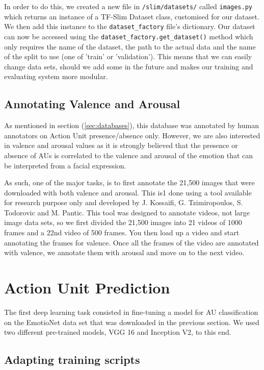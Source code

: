 \documentclass[12pt,twoside]{article}
\begin{document}
In order to do this, we created a new file in \texttt{/slim/datasets/} called \texttt{images.py} 
which returns an instance of a TF-Slim Dataset class, customised for our dataset. 
We then add this instance to the \texttt{dataset\_factory} file's dictionary.
Our dataset can now be accessed using the
\texttt{dataset\_factory.get\_dataset()} method which only requires the name of
the dataset, the path to the actual data and the name of the split to use (one
of 'train' or 'validation'). This means that we can easily change data sets,
should we add some in the future and makes our training and evaluating system
more modular.

\subsection{Annotating Valence and Arousal}

As mentioned in section (\ref{sec:databases}), this database was annotated by human annotators
on Action Unit presence/absence only. However, we are also interested in
valence and arousal values as it is strongly believed that the presence or absence of
AUs is correlated to the valence and arousal of the emotion that can be
interpreted from a facial expression.

As such, one of the major tasks, is to first annotate the 21,500 images that
were downloaded with both valence and arousal. This is1 done using a tool
available for research purpose only and developed by J. Kossaifi, 
G. Tzimiropoulos, S. Todorovic and M. Pantic. This tool was designed to
annotate videos, not large image data sets, so we first divided the 21,500
images into 21 videos of 1000 frames and a 22nd video of 500 frames. You then
load up a video and start annotating the frames for valence. Once all the
frames of the video are annotated with valence, we annotate them with arousal
and move on to the next video.

\clearpage
\section{Action Unit Prediction}

The first deep learning task consisted in fine-tuning a model for AU
classification on the EmotioNet data set that was downloaded in the previous
section. We used two different pre-trained models, VGG 16 and Inception V2, to
this end.

\subsection{Adapting training scripts}
\end{document}
